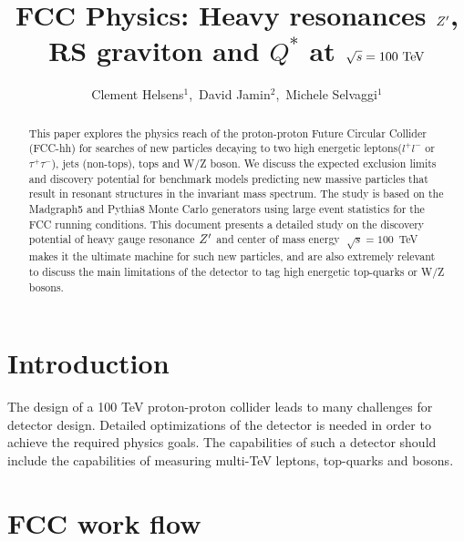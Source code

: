 \documentclass{cernrep}
\begin{document}
\title{FCC Physics: Heavy resonances $Z^{\prime}$, RS graviton and $Q^{*}$ at $\sqrt{s} = 100 \TeV$}
\author{Clement Helsens${}^1$,\,
David Jamin${}^2$,\,
Michele Selvaggi${}^1$}


\begin{abstract}
This paper explores the physics reach of the proton-proton Future Circular Collider (FCC-hh)
for searches of new particles decaying to two high energetic leptons($l^{+}l^{-}$ or $\tau^{+}\tau^{-}$), jets (non-tops), tops and W/Z boson. We discuss the expected exclusion limits and discovery potential for benchmark models 
predicting new massive particles that result in resonant structures in
the invariant mass spectrum. The study is based on the Madgraph5 and Pythia8 Monte Carlo generators using large event statistics for the FCC running conditions. 
This document presents a detailed study on the discovery potential of heavy gauge resonance $Z^{\prime}$ and center of mass energy $\sqrt[]{s} =100$~TeV makes it the ultimate machine for such new particles, and are also extremely relevant to discuss the main limitations of the detector to tag high energetic top-quarks or W/Z bosons.
\end{abstract}
\maketitle
\tableofcontents

\section{Introduction}
The design of a 100 TeV proton-proton collider leads to many challenges for detector design. Detailed optimizations of the detector is needed in order to achieve the required physics goals. The capabilities of such a detector should include the capabilities of measuring multi-TeV leptons, top-quarks and bosons.

\section{FCC work flow}
\label{sec:fccworkflow}
\end{document}

